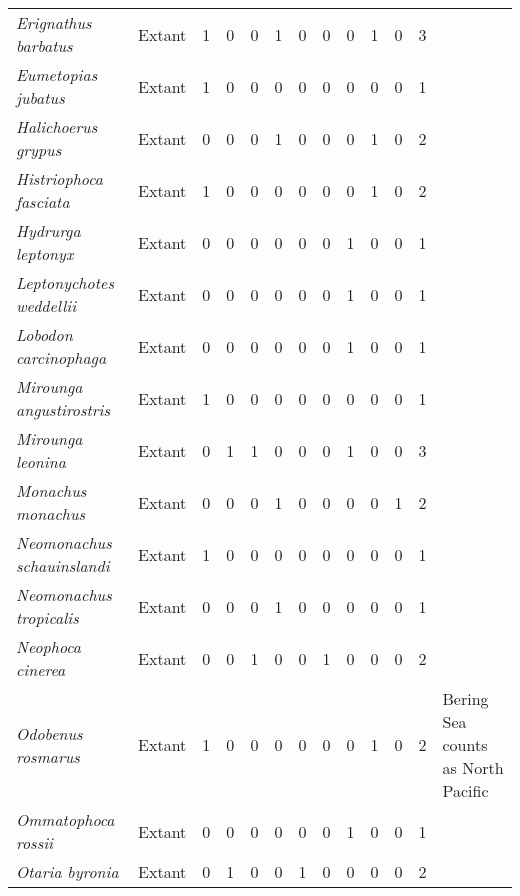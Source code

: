 \begin{longtable}{llccccccccccp{}}
\textit{Erignathus barbatus} &
Extant &
1 &
0 &
0 &
1 &
0 &
0 &
0 &
1 &
0 &
3 &
\\

\textit{Eumetopias jubatus} &
Extant &
1 &
0 &
0 &
0 &
0 &
0 &
0 &
0 &
0 &
1 &
\\

\textit{Halichoerus grypus} &
Extant &
0 &
0 &
0 &
1 &
0 &
0 &
0 &
1 &
0 &
2 &
\\

\textit{Histriophoca fasciata} &
Extant &
1 &
0 &
0 &
0 &
0 &
0 &
0 &
1 &
0 &
2 &
\\

\textit{Hydrurga leptonyx} &
Extant &
0 &
0 &
0 &
0 &
0 &
0 &
1 &
0 &
0 &
1 &
\\

\textit{Leptonychotes weddellii} &
Extant &
0 &
0 &
0 &
0 &
0 &
0 &
1 &
0 &
0 &
1 &
\\

\textit{Lobodon carcinophaga} &
Extant &
0 &
0 &
0 &
0 &
0 & 
0 &
1 &
0 &
0 &
1 &
\\

\textit{Mirounga angustirostris} &
Extant &
1 &
0 &
0 &
0 &
0 &
0 &
0 &
0 &
0 &
1 &
\\

\textit{Mirounga leonina} &
Extant &
0 &
1 &
1 &
0 &
0 &
0 &
1 &
0 &
0 &
3 &
\\

\textit{Monachus monachus} &
Extant &
0 &
0 &
0 &
1 &
0 &
0 &
0 &
0 &
1 &
2 &
\\

\textit{Neomonachus schauinslandi} &
Extant &
1 &
0 &
0 &
0 &
0 &
0 &
0 &
0 &
0 &
1 &
\\


\textit{Neomonachus tropicalis} &
Extant &
0 &
0 &
0 &
1 &
0 &
0 &
0 &
0 &
0 &
1 &
\\

\textit{Neophoca cinerea} &
Extant &
0 &
0 &
1 &
0 &
0 &
1 &
0 &
0 &
0 &
2 &
\\

\textit{Odobenus rosmarus} &
Extant &
1 &
0 &
0 &
0 &
0 &
0 &
0 &
1 &
0 &
2 &
Bering Sea counts as North Pacific\\

\textit{Ommatophoca rossii} &
Extant &
0 &
0 &
0 &
0 &
0 &
0 &
1 &
0 &
0 &
1 &
\\

\textit{Otaria byronia} &
Extant &
0 &
1 &
0 &
0 &
1 &
0 &
0 &
0 &
0 &
2 &
\\


\end{longtable}
